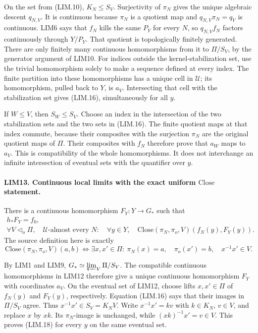 On the set from (LIM.10), \(K_N\le S_V\).
Surjectivity of \(\pi_N\) gives the unique algebraic descent
\(q_{N,V}\).  It is continuous because \(\pi_N\) is a quotient
map and \(q_{N,V}\pi_N=q_V\) is continuous.
LIM6 says that \(f_N\) kills the same \(P_Y\) for every \(N\),
so \(q_{N,V}f_N\) factors continuously through \(Y/P_Y\).
That quotient is topologically finitely generated.
There are only finitely many continuous homomorphisms from it
to \(\Pi/S_V\), by the generator argument of LIM10.
For indices outside the kernel-stabilization set, use the trivial
homomorphism solely to make a sequence defined at every index.
The finite partition into these homomorphisms has a unique cell
in \(\mathcal U\); its homomorphism, pulled back to \(Y\), is
\(a_V\).  Intersecting that cell with the stabilization set gives
(LIM.16), simultaneously for all \(y\).

If \(W\le V\), then \(S_W\le S_V\).
Choose an index in the intersection of the two stabilization sets
and the two sets in (LIM.16).  The finite quotient maps at that
index commute, because their composites with the surjection
\(\pi_N\) are the original quotient maps of \(\Pi\).
Their composites with \(f_N\) therefore prove that \(a_W\)
maps to \(a_V\).  This is compatibility of the whole
homomorphisms.  It does not interchange an infinite intersection
of eventual sets with the quantifier over \(y\).

\paragraph{LIM13. Continuous local limits with the exact uniform \(\mathrm{Close}\) statement.}
\label{claim:LIM13}
There is a continuous homomorphism \(F_Y:Y\to G_*\) such that
\[
 \begin{gathered}
 h_*F_Y=f_0,\\
 \forall V\triangleleft_o\Pi,\quad
 \mathcal U\text{-almost every }N:\quad
 \forall y\in Y,\quad
 \mathrm{Close}(\pi_N,\pi_o,V)(f_N(y),F_Y(y)).
 \end{gathered}
 \tag{LIM.17}
\]
The source definition here is exactly
\[
 \mathrm{Close}(\pi_N,\pi_o,V)(a,b)
 \iff \exists x,x'\in\Pi:\
       \pi_N(x)=a,\quad\pi_o(x')=b,\quad x^{-1}x'\in V.
 \tag{LIM.18}
\]

By LIM1 and LIM9,
\(G_*\simeq\varprojlim_V\Pi/S_V\).
The compatible continuous homomorphisms in LIM12 therefore give
a unique continuous homomorphism \(F_Y\) with coordinates \(a_V\).
On the eventual set of LIM12, choose lifts \(x,x'\in\Pi\) of
\(f_N(y)\) and \(F_Y(y)\), respectively.
Equation (LIM.16) says that their images in \(\Pi/S_V\) agree.
Thus \(x^{-1}x'\in S_V=K_NV\).
Write \(x^{-1}x'=kv\) with \(k\in K_N\), \(v\in V\),
and replace \(x\) by \(xk\).
Its \(\pi_N\)-image is unchanged, while
\((xk)^{-1}x'=v\in V\).
This proves (LIM.18) for every \(y\) on the same eventual set.

